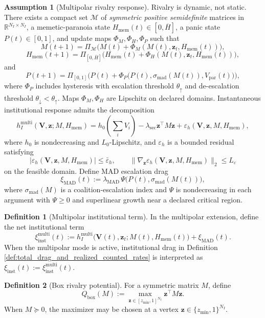 \documentclass[11pt,a4paper]{article}
\newcommand{\R}{\mathbb{R}}
\newcommand{\eps}{\varepsilon}
\theoremstyle{definition}
\newtheorem{definition}{Definition}
\newtheorem{assumption}{Assumption}
\theoremstyle{remark}
\begin{document}
\begin{assumption}[Multipolar rivalry response]\label{ass:multipolar}
Rivalry is dynamic, not static.
There exists a compact set $\mathcal M$ of \emph{symmetric positive semidefinite} matrices in $\R^{N_I\times N_I}$, a memetic-paranoia state $H_{\mathrm{mem}}(t)\in[0,\overline H]$, a panic state $P(t)\in[0,1]$, and update maps $\Phi_M,\Phi_H,\Phi_P$ such that
\[
M(t+1)=\Pi_{\mathcal M}\!\big(M(t)+\Phi_M(M(t),\bm z_t,H_{\mathrm{mem}}(t))\big),
\]
\[
H_{\mathrm{mem}}(t+1)=\Pi_{[0,\overline H]}\!\big(H_{\mathrm{mem}}(t)+\Phi_H(M(t),\bm z_t,H_{\mathrm{mem}}(t))\big),
\]
and
\[
P(t+1)=\Pi_{[0,1]}\!\Big(P(t)+\Phi_P\big(P(t),\sigma_{\mathrm{mad}}(M(t)),V_{\mathrm{par}}(t)\big)\Big),
\]
where $\Phi_P$ includes hysteresis with escalation threshold $\theta_\uparrow$ and de-escalation threshold $\theta_\downarrow<\theta_\uparrow$.
Maps $\Phi_M,\Phi_H$ are Lipschitz on declared domains.
Instantaneous institutional response admits the decomposition
\[
h_I^{\mathrm{multi}}(\bm V,\bm z;M,H_{\mathrm{mem}})
=h_0\!\left(\sum_i V_i\right)-\lambda_{\mathrm{sec}}\bm z^\top M\bm z+\eps_h(\bm V,\bm z,M,H_{\mathrm{mem}}),
\]
where $h_0$ is nondecreasing and $L_0$-Lipschitz, and $\eps_h$ is a bounded residual satisfying
\[
|\eps_h(\bm V,\bm z,M,H_{\mathrm{mem}})|\le \bar\eps_h,
\qquad
\|\nabla_{\bm z}\eps_h(\bm V,\bm z,M,H_{\mathrm{mem}})\|_2\le L_{\eps}
\]
on the feasible domain.
Define MAD escalation drag
\[
\xi_{\mathrm{MAD}}(t):=\lambda_{\mathrm{MAD}}\,\Psi\!\big(P(t),\sigma_{\mathrm{mad}}(M(t))\big),
\]
where $\sigma_{\mathrm{mad}}(M)$ is a coalition-escalation index and $\Psi$ is nondecreasing in each argument with $\Psi\ge 0$ and superlinear growth near a declared critical region.
\end{assumption}

\begin{definition}[Multipolar institutional term]\label{def:xi_inst_multi}
In the multipolar extension, define the net institutional term
\[
\xi_{\mathrm{inst}}^{\mathrm{multi}}(t):=h_I^{\mathrm{multi}}\!\big(\bm V(t),\bm z_t;M(t),H_{\mathrm{mem}}(t)\big)+\xi_{\mathrm{MAD}}(t).
\]
When the multipolar mode is active, institutional drag in Definition \ref{def:total_drag_and_realized_counted_rates} is interpreted as $\xi_{\mathrm{inst}}(t):=\xi_{\mathrm{inst}}^{\mathrm{multi}}(t)$.
\end{definition}



\begin{definition}[Box rivalry potential]\label{def:box_rivalry_potential}
For a symmetric matrix $M$, define
\[
Q_{\mathrm{box}}(M):=\max_{\bm z\in[z_{\min},1]^{N_I}} \bm z^\top M\bm z.
\]
When $M\succeq 0$, the maximizer may be chosen at a vertex $\bm z\in\{z_{\min},1\}^{N_I}$.
\end{definition}
\end{document}
